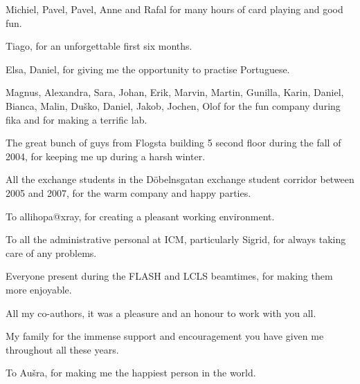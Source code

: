 \noindent
Michiel, Pavel, Pavel, Anne and Rafal for many hours of card playing and good fun.
\vspace{0.5cm}

\noindent
Tiago, for an unforgettable first six months.
\vspace{0.5cm}

\noindent
Elsa, Daniel, for giving me the opportunity to practise Portuguese.
\vspace{0.5cm}

\noindent
Magnus, Alexandra, Sara, Johan, Erik, Marvin, Martin, Gunilla, Karin,
Daniel, Bianca, Malin, Du\v{s}ko, Daniel, Jakob, Jochen, Olof for the fun company during
fika and for making a terrific lab.
\vspace{0.5cm}

\noindent 
The great bunch of guys from Flogsta building 5 second floor during the fall of
2004, for keeping me up during a harsh winter.
\vspace{0.5cm}
 
\noindent
All the exchange students in the D\"obelnsgatan exchange student corridor between 
2005 and 2007, for the warm company and happy parties.
\vspace{0.5cm}
 
\noindent
To allihopa@xray, for creating a pleasant working environment.
\vspace{0.5cm}

\noindent
To all the administrative personal at ICM, particularly Sigrid, for always
taking care of any problems.
\vspace{0.5cm}

\noindent
Everyone present during the FLASH and LCLS beamtimes, for making them more enjoyable.
\vspace{0.5cm}

\noindent
All my co-authors, it was a pleasure and an honour to work with you all.
\vspace{0.5cm}

\noindent
My family for the immense support and encouragement you have given me
throughout all these years.
\vspace{0.5cm}

\noindent
To Au\v{s}ra, for making me the happiest person in the world.

